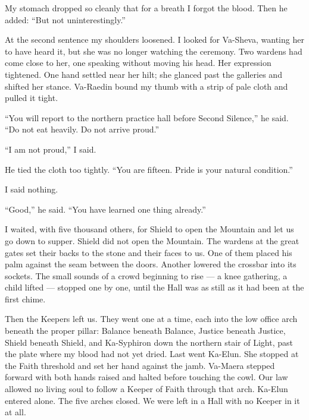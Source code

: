 My stomach dropped so cleanly that for a breath I forgot the blood. Then he added: ``But not uninterestingly.''\par

At the second sentence my shoulders loosened. I looked for Va-Sheva, wanting her to have heard it, but she was no longer watching the ceremony. Two wardens had come close to her, one speaking without moving his head. Her expression tightened. One hand settled near her hilt; she glanced past the galleries and shifted her stance. Va-Raedin bound my thumb with a strip of pale cloth and pulled it tight.\par

``You will report to the northern practice hall before Second Silence,'' he said. ``Do not eat heavily. Do not arrive proud.''\par

``I am not proud,'' I said.\par

He tied the cloth too tightly. ``You are fifteen. Pride is your natural condition.'' \par

I said nothing.\par

``Good,'' he said. ``You have learned one thing already.''\par

I waited, with five thousand others, for Shield to open the Mountain and let us go down to supper. Shield did not open the Mountain. The wardens at the great gates set their backs to the stone and their faces to us. One of them placed his palm against the seam between the doors. Another lowered the crossbar into its sockets. The small sounds of a crowd beginning to rise --- a knee gathering, a child lifted --- stopped one by one, until the Hall was as still as it had been at the first chime.\par

Then the Keepers left us. They went one at a time, each into the low office arch beneath the proper pillar: Balance beneath Balance, Justice beneath Justice, Shield beneath Shield, and Ka-Syphiron down the northern stair of Light, past the plate where my blood had not yet dried. Last went Ka-Elun. She stopped at the Faith threshold and set her hand against the jamb. Va-Maera stepped forward with both hands raised and halted before touching the cowl. Our law allowed no living soul to follow a Keeper of Faith through that arch. Ka-Elun entered alone. The five arches closed. We were left in a Hall with no Keeper in it at all.\par

